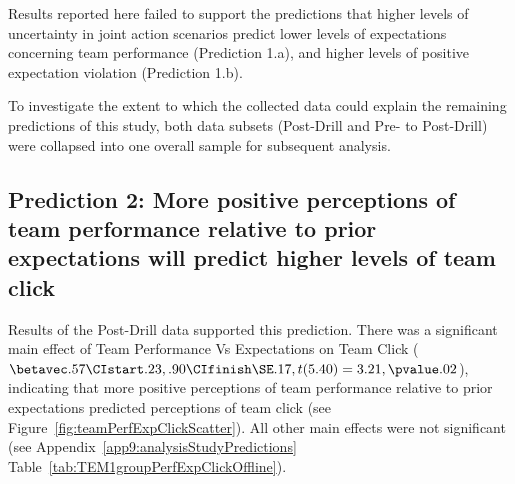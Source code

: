 \begin{CJK}{UTF8}{gbsn}
Results reported here failed to support the predictions that higher levels of uncertainty in joint action scenarios predict lower levels of expectations concerning team performance (Prediction 1.a), and higher levels of positive expectation violation (Prediction 1.b).

To investigate the extent to which the collected data could explain the remaining predictions of this study, both data subsets (Post-Drill and Pre- to Post-Drill) were collapsed into one overall sample for subsequent analysis.



\subsection{Prediction 2: More positive perceptions of team performance relative to prior expectations will predict higher levels of team click}

Results of the Post-Drill data supported this prediction. There was a significant main effect of Team Performance Vs Expectations on Team Click ($\betavec .57 \CIstart .23, .90 \CIfinish \SE .17, t(5.40) = 3.21, \pvalue .02$), indicating that more positive perceptions of team performance relative to prior expectations predicted perceptions of team click (see Figure~\ref{fig:teamPerfExpClickScatter}).  All other main effects were not significant (see Appendix~\ref{app9:analysisStudyPredictions} Table~\ref{tab:TEM1groupPerfExpClickOffline}).



\end{CJK}
